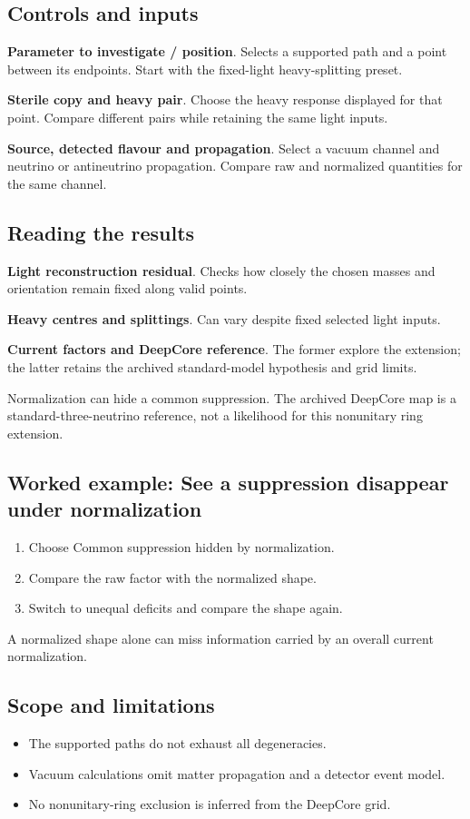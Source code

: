 \documentclass[11pt,a4paper]{article}
\begin{document}
\subsection*{Controls and inputs}
\textbf{Parameter to investigate / position}. Selects a supported path and a point between its endpoints. Start with the fixed-light heavy-splitting preset.

\textbf{Sterile copy and heavy pair}. Choose the heavy response displayed for that point. Compare different pairs while retaining the same light inputs.

\textbf{Source, detected flavour and propagation}. Select a vacuum channel and neutrino or antineutrino propagation. Compare raw and normalized quantities for the same channel.

\subsection*{Reading the results}
\textbf{Light reconstruction residual}. Checks how closely the chosen masses and orientation remain fixed along valid points.

\textbf{Heavy centres and splittings}. Can vary despite fixed selected light inputs.

\textbf{Current factors and DeepCore reference}. The former explore the extension; the latter retains the archived standard-model hypothesis and grid limits.

Normalization can hide a common suppression. The archived DeepCore map is a standard-three-neutrino reference, not a likelihood for this nonunitary ring extension.
\subsection*{Worked example: See a suppression disappear under normalization}
\begin{enumerate}
\item Choose Common suppression hidden by normalization.
\item Compare the raw factor with the normalized shape.
\item Switch to unequal deficits and compare the shape again.
\end{enumerate}
A normalized shape alone can miss information carried by an overall current normalization.
\subsection*{Scope and limitations}
\begin{itemize}
\item The supported paths do not exhaust all degeneracies.
\item Vacuum calculations omit matter propagation and a detector event model.
\item No nonunitary-ring exclusion is inferred from the DeepCore grid.
\end{itemize}
\end{document}
